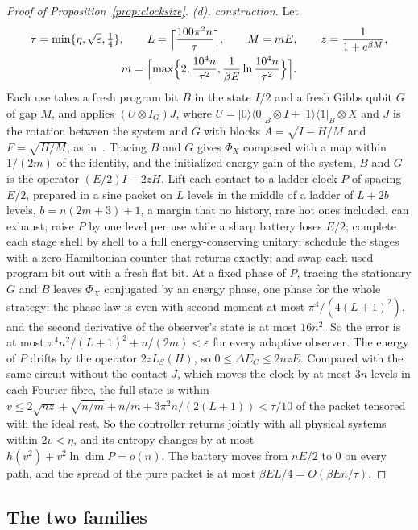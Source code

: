 \documentclass[11pt]{article}
\theoremstyle{definition}
\theoremstyle{remark}
\begin{document}
\begin{proof}[Proof of Proposition~\ref{prop:clocksize}]
\emph{(d), construction.} Let
\begin{gather*}
\tau=\min\{\eta,\sqrt\varepsilon,\tfrac14\},\qquad L=\Bigl\lceil\frac{100\pi^2n}{\tau}\Bigr\rceil,\qquad M=mE,\qquad z=\frac1{1+e^{\beta M}},\\
m=\Bigl\lceil\max\Bigl\{2,\frac{10^4n}{\tau^2},\frac1{\beta E}\ln\frac{10^4n}{\tau^2}\Bigr\}\Bigr\rceil.
\end{gather*} Each use takes a fresh program bit $B$ in the state $I/2$ and a fresh Gibbs qubit $G$ of gap $M$, and applies $(U\otimes I_G)J$, where $U=|0\rangle\langle0|_B\otimes I+|1\rangle\langle1|_B\otimes X$ and $J$ is the rotation between the system and $G$ with blocks $A=\sqrt{I-H/M}$ and $F=\sqrt{H/M}$, as in~\cite{SaveWork}. Tracing $B$ and $G$ gives $\Phi_X$ composed with a map within $1/(2m)$ of the identity, and the initialized energy gain of the system, $B$ and $G$ is the operator $(E/2)I-2zH$. Lift each contact to a ladder clock $P$ of spacing $E/2$, prepared in a sine packet on $L$ levels in the middle of a ladder of $L+2b$ levels, $b=n(2m+3)+1$, a margin that no history, rare hot ones included, can exhaust; raise $P$ by one level per use while a sharp battery loses $E/2$; complete each stage shell by shell to a full energy-conserving unitary; schedule the stages with a zero-Hamiltonian counter that returns exactly; and swap each used program bit out with a fresh flat bit. At a fixed phase of $P$, tracing the stationary $G$ and $B$ leaves $\Phi_X$ conjugated by an energy phase, one phase for the whole strategy; the phase law is even with second moment at most $\pi^4/(4(L+1)^2)$, and the second derivative of the observer's state is at most $16n^2$. So the error is at most $\pi^4n^2/(L+1)^2+n/(2m)<\varepsilon$ for every adaptive observer. The energy of $P$ drifts by the operator $2zL_S(H)$, so $0\le\Delta E_C\le2nzE$. Compared with the same circuit without the contact $J$, which moves the clock by at most $3n$ levels in each Fourier fibre, the full state is within $v\le2\sqrt{nz}+\sqrt{n/m}+n/m+3\pi^2n/(2(L+1))<\tau/10$ of the packet tensored with the ideal rest. So the controller returns jointly with all physical systems within $2v<\eta$, and its entropy changes by at most $h(v^2)+v^2\ln\dim P=o(n)$. The battery moves from $nE/2$ to $0$ on every path, and the spread of the pure packet is at most $\beta EL/4=O(\beta En/\tau)$.
\end{proof}

\subsection{The two families}\label{pf:families}
\end{document}
